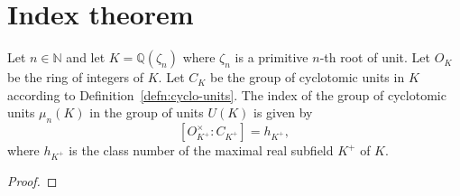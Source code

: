 \section{Index theorem}
\begin{thm}\label{thm:index}
    \notready
    Let $n \in \mathbb{N}$ and let $K = \mathbb{Q}(\zeta_n)$ where $\zeta_n$ is a primitive $n$-th root of unit. 
    Let $O_K$ be the ring of integers of $K$. 
    Let $C_K$ be the group of cyclotomic units in $K$ according to Definition~\ref{defn:cyclo-units}.
    The index of the group of cyclotomic units $\mu_n(K)$ in the group of units $U(K)$ is given by
    \[
        [O_{K^+}^\times : C_{K^+}] = h_{K^+},
    \]
    where $h_{K^+}$ is the class number of the maximal real subfield $K^+$ of $K$.
\end{thm}

\begin{proof}
    \notready
\end{proof}
